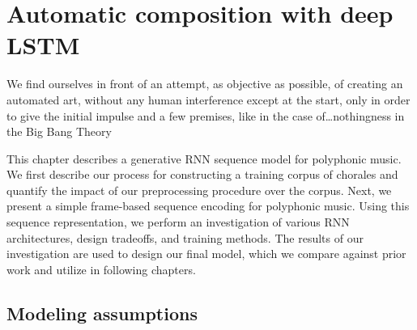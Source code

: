 \chapter{Automatic composition with deep LSTM}
\begin{savequote}[75mm]
  We find ourselves in front of an attempt, as objective as possible, of creating
  an automated art, without any human interference except at the start, only in
  order to give the initial impulse and a few premises, like in the case
  of\ldots nothingness in the Big Bang Theory
\end{savequote}
\ifpdf
    \graphicspath{{Chapter4/Figs/Raster/}{Chapter4/Figs/PDF/}{Chapter4/Figs/}}
\else
    \graphicspath{{Chapter4/Figs/Vector/}{Chapter4/Figs/}}
\fi

This chapter describes a generative RNN sequence model for polyphonic music. We
first describe our process for constructing a training corpus of chorales and
quantify the impact of our preprocessing procedure over the corpus. Next, we
present a simple frame-based sequence encoding for polyphonic music. Using this
sequence representation, we perform an investigation of various RNN
architectures, design tradeoffs, and training methods. The results of our
investigation are used to design our final model, which we compare against
prior work and utilize in following chapters.

\section{Modeling assumptions}


